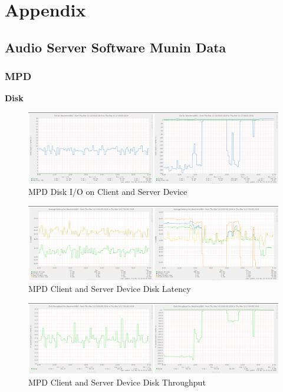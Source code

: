 \documentclass[11pt,a4paper,headinclude=false,footinclude=false]{scrreprt}
\begin{document}
\chapter{\texorpdfstring{Appendix
\label{Appendix}}{Appendix }}\label{appendix}

\section{\texorpdfstring{Audio Server Software Munin Data
\label{MuninData}}{Audio Server Software Munin Data }}\label{audio-server-software-munin-data}

\subsection{MPD}\label{mpd-2}

\textbf{Disk}

\begin{figure}[H]
\includegraphics{ResultsAndAnalysis/MPDServerTestImages/005MPDDiskIO.png}
\centering
\caption{MPD Disk I/O on Client and Server Device}
\label{MPDDiskIO}
\end{figure}

\begin{figure}[H]
\includegraphics{ResultsAndAnalysis/MPDServerTestImages/006MPDDiskLatency.png}
\centering
\caption{MPD Client and Server Device Disk Latency}
\label{MPDDiskLatency}
\end{figure}

\begin{figure}[H]
\includegraphics{ResultsAndAnalysis/MPDServerTestImages/007MPDDiskThroughput.png}
\centering
\caption{MPD Client and Server Device Disk Throughput}
\label{MPDDiskThroughput}
\end{figure}
\end{document}
